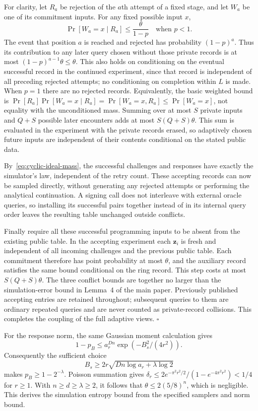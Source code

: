 \documentclass[lettersize,journal]{IEEEtran}
\newenvironment{proof}{{\noindent\it Proof:} }{\hfill $\square$\par}
\begin{document}
\begin{proof}
	For clarity, let $R_a$ be rejection of the $a$th attempt of a fixed stage, and let $W_a$ be one of its commitment inputs. For any fixed possible input $x$,
	\[
	\Pr[W_a=x\mid R_a]\le\frac{\theta}{1-p}
	\quad\text{when }p<1.
	\]
	The event that position $a$ is reached and rejected has probability $(1-p)^a$. Thus its contribution to any later query chosen without those private records is at most $(1-p)^{a-1}\theta\le\theta$. This also holds on conditioning on the eventual successful record in the continued experiment, since that record is independent of all preceding rejected attempts; no conditioning on completion within $L$ is made. When $p=1$ there are no rejected records. Equivalently, the basic weighted bound is $\Pr[R_a]\Pr[W_a=x\mid R_a]=\Pr[W_a=x,R_a]\le\Pr[W_a=x]$, not equality with the unconditioned mass. Summing over at most $S$ private inputs and $Q+S$ possible later encounters adds at most $S(Q+S)\theta$. This sum is evaluated in the experiment with the private records erased, so adaptively chosen future inputs are independent of their contents conditional on the stated public data.
	
	By~\eqref{eq:cyclic-ideal-mass}, the successful challenges and responses have exactly the simulator's law, independent of the retry count. These accepting records can now be sampled directly, without generating any rejected attempts or performing the analytical continuation. A signing call does not interleave with external oracle queries, so installing its successful pairs together instead of in its internal query order leaves the resulting table unchanged outside conflicts.
	
	Finally require all these successful programming inputs to be absent from the existing public table. In the accepting experiment each $\mathbf z_i$ is fresh and independent of all incoming challenges and the previous public table. Each commitment therefore has point probability at most $\theta$, and the auxiliary record satisfies the same bound conditional on the ring record. This step costs at most $S(Q+S)\theta$. The three conflict bounds are together no larger than the simulation-error bound in Lemma~4 of the main paper. Previously published accepting entries are retained throughout; subsequent queries to them are ordinary repeated queries and are never counted as private-record collisions. This completes the coupling of the full adaptive views.
\end{proof}

For the response norm, the same Gaussian moment calculation gives
\[
1-p_B\le a_r^{Dn}\exp(-B_s^2/(4r^2)).
\]
Consequently the sufficient choice
\begin{equation}\label{eq:cyclic-response-choice}
	B_s\ge2r\sqrt{Dn\log a_r+\lambda\log2}
\end{equation}
makes $p_B\ge1-2^{-\lambda}$. Poisson summation gives
$\delta_r\le2e^{-\pi^2r^2/2}/(1-e^{-4\pi^2r^2})<1/4$ for $r\ge1$. With $n\ge d\ge\lambda\ge2$, it follows that $\theta\le2(5/8)^n$, which is negligible. This derives the simulation entropy bound from the specified samplers and norm bound.
\end{document}
